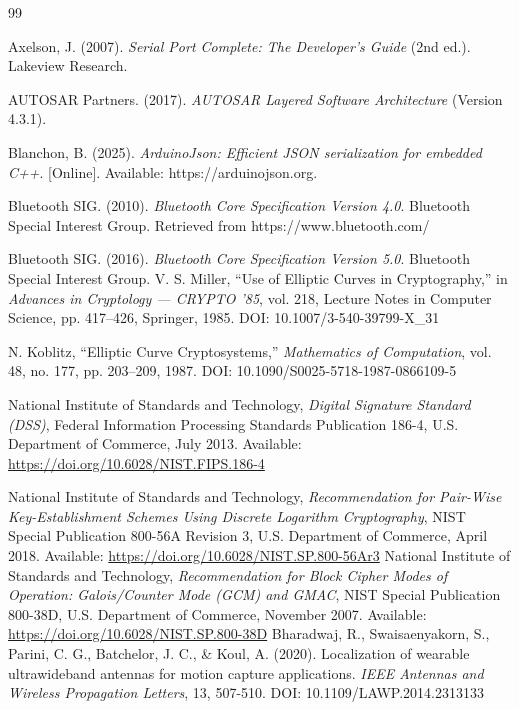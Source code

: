 \newpage

\begin{thebibliography}{99}

Axelson, J. (2007). \textit{Serial Port Complete: The Developer's Guide} (2nd ed.). Lakeview Research.

AUTOSAR Partners. (2017). \textit{AUTOSAR Layered Software Architecture} (Version 4.3.1).

Blanchon, B. (2025). \textit{ArduinoJson: Efficient JSON serialization for embedded C++}. [Online]. Available: https://arduinojson.org.

Bluetooth SIG. (2010). \textit{Bluetooth Core Specification Version 4.0}. Bluetooth Special Interest Group. Retrieved from https://www.bluetooth.com/

Bluetooth SIG. (2016). \textit{Bluetooth Core Specification Version 5.0}. Bluetooth Special Interest Group.
 V. S. Miller, ``Use of Elliptic Curves in Cryptography,'' in \textit{Advances in Cryptology --- CRYPTO '85}, vol. 218, Lecture Notes in Computer Science, pp. 417--426, Springer, 1985. DOI: 10.1007/3-540-39799-X\_31

 N. Koblitz, ``Elliptic Curve Cryptosystems,'' \textit{Mathematics of Computation}, vol. 48, no. 177, pp. 203--209, 1987. DOI: 10.1090/S0025-5718-1987-0866109-5

 National Institute of Standards and Technology, \textit{Digital Signature Standard (DSS)}, Federal Information Processing Standards Publication 186-4, U.S. Department of Commerce, July 2013. Available: \url{https://doi.org/10.6028/NIST.FIPS.186-4}

 National Institute of Standards and Technology, \textit{Recommendation for Pair-Wise Key-Establishment Schemes Using Discrete Logarithm Cryptography}, NIST Special Publication 800-56A Revision 3, U.S. Department of Commerce, April 2018. Available: \url{https://doi.org/10.6028/NIST.SP.800-56Ar3}
 National Institute of Standards and Technology, \textit{Recommendation for Block Cipher Modes of Operation: Galois/Counter Mode (GCM) and GMAC}, NIST Special Publication 800-38D, U.S. Department of Commerce, November 2007. Available: \url{https://doi.org/10.6028/NIST.SP.800-38D}
Bharadwaj, R., Swaisaenyakorn, S., Parini, C. G., Batchelor, J. C., \& Koul, A. (2020). Localization of wearable ultrawideband antennas for motion capture applications. \textit{IEEE Antennas and Wireless Propagation Letters}, 13, 507-510. DOI: 10.1109/LAWP.2014.2313133


\end{thebibliography}
